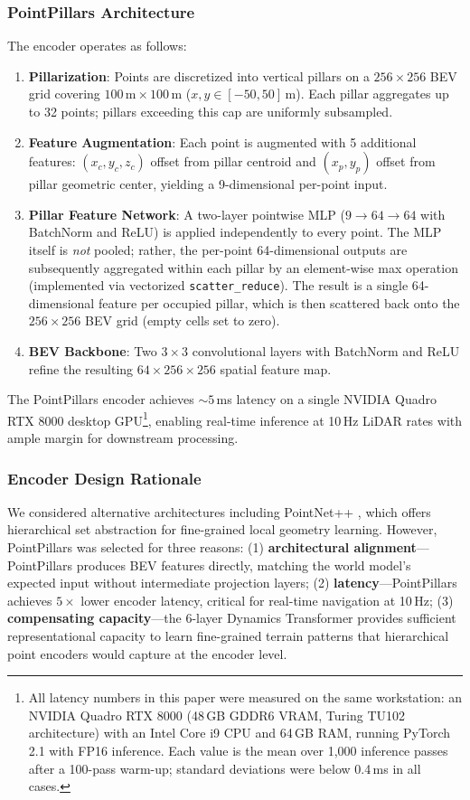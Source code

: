 \documentclass[sensors,article,submit,pdftex,moreauthors]{Definitions/mdpi}
\begin{document}
\subsubsection{PointPillars Architecture}
The encoder operates as follows:

\begin{enumerate}
    \item \textbf{Pillarization}: Points are discretized into vertical pillars on a $256 \times 256$ BEV grid covering $100\,\text{m} \times 100\,\text{m}$ ($x, y \in [-50, 50]$\,m). Each pillar aggregates up to 32 points; pillars exceeding this cap are uniformly subsampled.
    \item \textbf{Feature Augmentation}: Each point is augmented with 5 additional features: $(x_c, y_c, z_c)$ offset from pillar centroid and $(x_p, y_p)$ offset from pillar geometric center, yielding a 9-dimensional per-point input.
    \item \textbf{Pillar Feature Network}: A two-layer pointwise MLP ($9 \rightarrow 64 \rightarrow 64$ with BatchNorm and ReLU) is applied independently to every point. The MLP itself is \emph{not} pooled; rather, the per-point 64-dimensional outputs are subsequently aggregated within each pillar by an element-wise max operation (implemented via vectorized \texttt{scatter\_reduce}). The result is a single 64-dimensional feature per occupied pillar, which is then scattered back onto the $256 \times 256$ BEV grid (empty cells set to zero).
    \item \textbf{BEV Backbone}: Two $3 \times 3$ convolutional layers with BatchNorm and ReLU refine the resulting $64 \times 256 \times 256$ spatial feature map.
\end{enumerate}

The PointPillars encoder achieves ${\sim}5$\,ms latency on a single NVIDIA Quadro RTX 8000 desktop GPU\footnote{All latency numbers in this paper were measured on the same workstation: an NVIDIA Quadro RTX 8000 (48\,GB GDDR6 VRAM, Turing TU102 architecture) with an Intel Core i9 CPU and 64\,GB RAM, running PyTorch 2.1 with FP16 inference. Each value is the mean over 1{,}000 inference passes after a 100-pass warm-up; standard deviations were below 0.4\,ms in all cases.}, enabling real-time inference at 10\,Hz LiDAR rates with ample margin for downstream processing.

\subsubsection{Encoder Design Rationale}
We considered alternative architectures including PointNet++ \cite{qi2017b}, which offers hierarchical set abstraction for fine-grained local geometry learning. However, PointPillars was selected for three reasons: (1) \textbf{architectural alignment}---PointPillars produces BEV features directly, matching the world model's expected input without intermediate projection layers; (2) \textbf{latency}---PointPillars achieves $5\times$ lower encoder latency, critical for real-time navigation at 10\,Hz; (3) \textbf{compensating capacity}---the 6-layer Dynamics Transformer provides sufficient representational capacity to learn fine-grained terrain patterns that hierarchical point encoders would capture at the encoder level.
\end{document}
